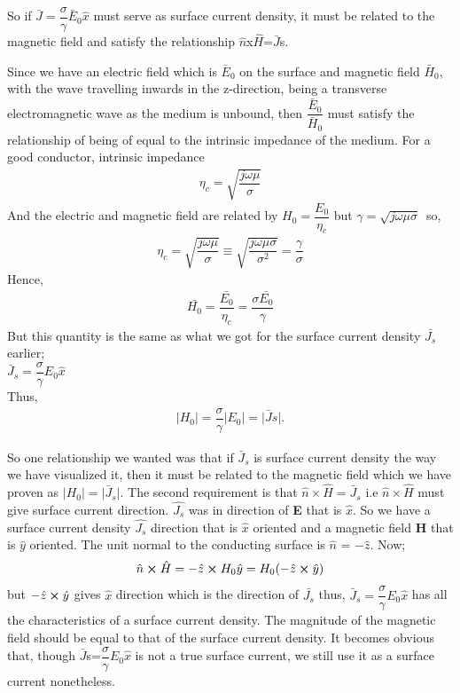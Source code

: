 So if 
$\bar{J}=\dfrac{\sigma}{\gamma}\bar{E}_0\hat{x}$ must serve as surface current density, it must be related to the magnetic field and satisfy the relationship $\hat{n}$x$\hat{H}$=$\bar{J}$s.

Since we have an electric field which is $\bar{E}$$_0$ on the surface and magnetic field $\bar{H}$$_0$, with the wave travelling inwards in the z-direction, being a transverse electromagnetic wave as the medium is unbound, then $\dfrac{\bar{E}_0}{\bar{H}_0}$ must satisfy the relationship of being of equal to the intrinsic impedance of the medium.
For a good conductor, intrinsic impedance
\begin{align}
\eta_{c}=\sqrt{\dfrac{j\omega\mu}{\sigma}} 
\end{align} 
And the electric and magnetic field are related by $H_0=\dfrac{E_0}{\eta_{c}}$
but $\gamma =\sqrt{j\omega\mu\sigma}$\ so,
\begin{align}
\eta_{c}=\sqrt{\dfrac{j\omega\mu}{\sigma}}\equiv\sqrt{\dfrac{j\omega\mu\sigma}{\sigma^{2}}}=\dfrac{\gamma}{\sigma}
\end{align}
Hence,
\begin{align}
\bar{H_{0}}=\dfrac{\bar{E_0}}{\eta_{c}}=\dfrac{\sigma \bar{E_0}}{\gamma}
\end{align}
But this quantity is the same as what we got for the surface current density $\bar{J_{s}}$ earlier; \\
$\bar{J}_s=\dfrac{\sigma}{\gamma}E_0\hat{x}$ \\
Thus,
\begin{align}
\lvert H_0\rvert=\dfrac{\sigma}{\gamma}\lvert E_0\rvert=\lvert \bar{J}s\rvert.
\end{align}

So one relationship we wanted was that if $\bar{J}_s$ is surface current density the way we have visualized it, then it must be related to the magnetic field which we have proven as $\lvert H_0\rvert=\lvert\bar{J}_s\rvert$. The second requirement is that $\hat{n}\times\hat{H}=\bar{J}_s$ i.e $\hat{n}\times\hat{H}$  must give surface current direction. $\hat{J_{s}}$ was in direction of \textbf{E} that is $\hat{x}$. So we have a surface current density $\hat{J_{s}}$ direction that is  $\hat{x}$ oriented and a magnetic field \textbf{H} that is $\hat{y}$ oriented. The unit normal to the conducting surface is $\hat{n}$ = $-\hat{z}$. Now;
\begin{equation*}
\hat{n} \cross \hat{H} = -\hat{z} \cross H_{0}\hat{y} = H_{0}(-\hat{z} \cross \hat{y})
\end{equation*}
but $-\hat{z} \cross \hat{y}$ gives $\hat{x}$ direction which is the direction of $\bar{J_{s}}$
thus, $\bar{J}_s = \dfrac{\sigma}{\gamma}E_0\hat{x}$ has all the characteristics of a surface current density. The magnitude of the magnetic field should be equal to that of the surface current density. It becomes obvious that, though $\bar{J}$s=$\dfrac{\sigma}{\gamma}$$E_0$$\hat{x}$ is not a true surface current, we still use it as a surface current nonetheless.

